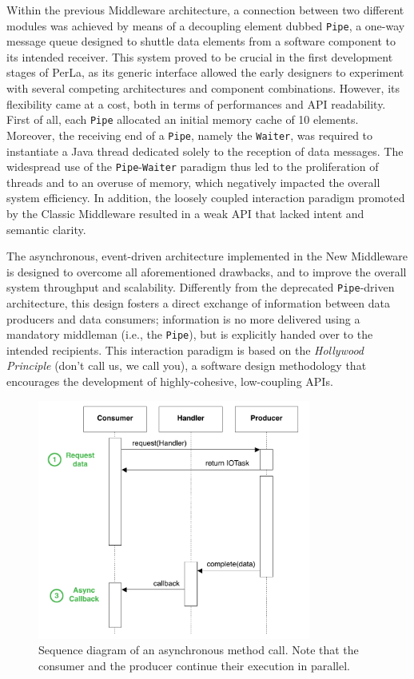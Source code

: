 Within the previous Middleware architecture, a connection between two different
modules was achieved by means of a decoupling element dubbed \texttt{Pipe}, a
one-way message queue designed to shuttle data elements from a software
component to its intended receiver. This system proved to be crucial in the
first development stages of PerLa, as its generic interface allowed the early
designers to experiment with several competing architectures and component
combinations. However, its flexibility came at a cost, both in terms of
performances and API readability. First of all, each \texttt{Pipe} allocated an
initial memory cache of 10 elements. Moreover, the receiving end of a
\texttt{Pipe}, namely the \texttt{Waiter}, was required to instantiate a Java
thread dedicated solely to the reception of data messages. The widespread use
of the \texttt{Pipe}-\texttt{Waiter} paradigm thus led to the proliferation of
threads and to an overuse of memory, which negatively impacted the overall
system efficiency. In addition, the loosely coupled interaction paradigm
promoted by the Classic Middleware resulted in a weak API that lacked intent
and semantic clarity.

The asynchronous, event-driven architecture implemented in the New Middleware
is designed to overcome all aforementioned drawbacks, and to improve the
overall system throughput and scalability. Differently from the deprecated
\texttt{Pipe}-driven architecture, this design fosters a direct exchange of
information between data producers and data consumers; information is no more
delivered using a mandatory middleman (i.e., the \texttt{Pipe}), but is
explicitly handed over to the intended recipients. This interaction paradigm is
based on the \textit{Hollywood Principle} (don't call us, we call you), a
software design methodology that encourages the development of highly-cohesive,
low-coupling APIs.

\begin{figure}[h!]
\center
\includegraphics[width=0.8\textwidth]{imgs/async_paradigm.pdf}
\caption{Sequence diagram of an asynchronous method call. Note that the
consumer and the producer continue their execution in parallel.}
\label{fig:async_paradigm}
\end{figure}

